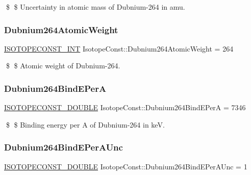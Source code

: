 \$ \$ Uncertainty in atomic mass of Dubnium-\/264 in amu. \mbox{\label{group___isotope_const-_dubnium-_db264_ga8a2595ea4c8afe3af679382a2b5d41d4}} 
\subsubsection{\texorpdfstring{Dubnium264\+Atomic\+Weight}{Dubnium264AtomicWeight}}
{\footnotesize\ttfamily \mbox{\hyperlink{group___isotope_const-_macros_ga5f18360b3e99483a35c32d789e62621c}{I\+S\+O\+T\+O\+P\+E\+C\+O\+N\+S\+T\+\_\+\+I\+NT}} Isotope\+Const\+::\+Dubnium264\+Atomic\+Weight = 264}

\$ \$ Atomic weight of Dubnium-\/264. \mbox{\label{group___isotope_const-_dubnium-_db264_ga112b8091aec9a2f5c62498e6ec57a977}} 
\subsubsection{\texorpdfstring{Dubnium264\+Bind\+E\+PerA}{Dubnium264BindEPerA}}
{\footnotesize\ttfamily \mbox{\hyperlink{group___isotope_const-_macros_ga8f45a7272ce02c0b4c65c44636ed719a}{I\+S\+O\+T\+O\+P\+E\+C\+O\+N\+S\+T\+\_\+\+D\+O\+U\+B\+LE}} Isotope\+Const\+::\+Dubnium264\+Bind\+E\+PerA = 7346}

\$ \$ Binding energy per A of Dubnium-\/264 in keV. \mbox{\label{group___isotope_const-_dubnium-_db264_gae83f08f68944523eb527e1e1f6bfc3c2}} 
\subsubsection{\texorpdfstring{Dubnium264\+Bind\+E\+Per\+A\+Unc}{Dubnium264BindEPerAUnc}}
{\footnotesize\ttfamily \mbox{\hyperlink{group___isotope_const-_macros_ga8f45a7272ce02c0b4c65c44636ed719a}{I\+S\+O\+T\+O\+P\+E\+C\+O\+N\+S\+T\+\_\+\+D\+O\+U\+B\+LE}} Isotope\+Const\+::\+Dubnium264\+Bind\+E\+Per\+A\+Unc = 1}

